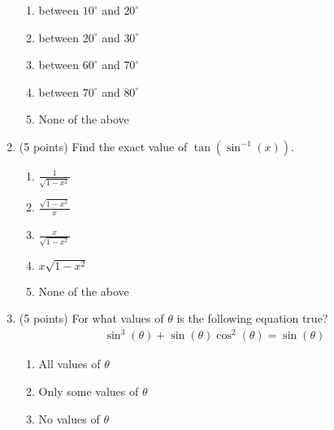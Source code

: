 \documentclass[fleqn]{article}
\begin{document}
\begin{enumerate}
\begin{enumerate}
\item between $10^\circ$ and $20^\circ$

\item between $20^\circ$ and $30^\circ$

\item between $60^\circ$ and $70^\circ$

\item between $70^\circ$ and $80^\circ$

\item None of the above

\end{enumerate}

\vspace{0.5in}

\item
(5 points) Find the exact value of $\tan(\sin^{-1}(x))$.

\begin{enumerate}
\item $\displaystyle \frac{1}{\sqrt{1 - x^2}}$
\vspace{.1in}
\item $\displaystyle \frac{\sqrt{1 - x^2}}{x}$
\vspace{.1in}
\item $\displaystyle \frac{x}{\sqrt{1 - x^2}}$
\vspace{.1in}
\item $x\sqrt{1-x^2}$
\vspace{.1in}
\item None of the above

\end{enumerate}

\vspace{0.5in}

\item
(5 points) For what values of $\theta$ is the following equation true?
\begin{align*}
\sin^3(\theta)+\sin(\theta)\cos^2(\theta) = \sin(\theta)
\end{align*}

\begin{enumerate}
\item All values of $\theta$

\item Only some values of $\theta$

\item No values of $\theta$

\end{enumerate}


\end{enumerate}
\end{document}
